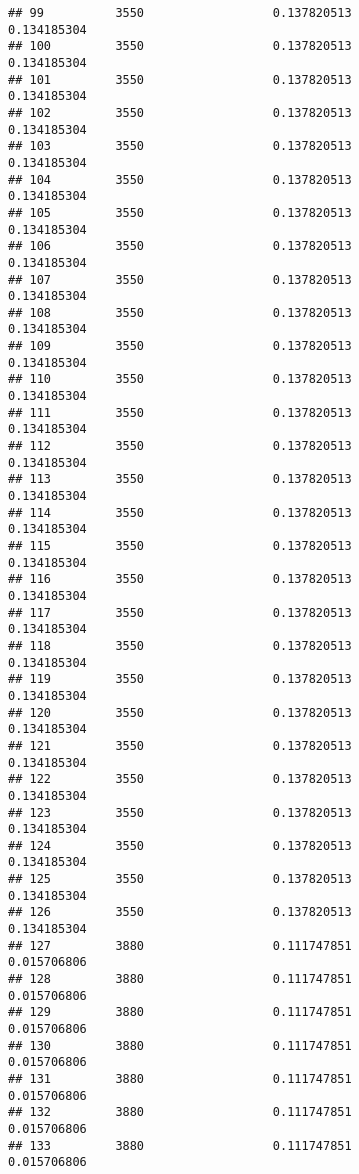 \documentclass[]{article}
\begin{document}
\begin{verbatim}
## 99          3550                  0.137820513                0.134185304
## 100         3550                  0.137820513                0.134185304
## 101         3550                  0.137820513                0.134185304
## 102         3550                  0.137820513                0.134185304
## 103         3550                  0.137820513                0.134185304
## 104         3550                  0.137820513                0.134185304
## 105         3550                  0.137820513                0.134185304
## 106         3550                  0.137820513                0.134185304
## 107         3550                  0.137820513                0.134185304
## 108         3550                  0.137820513                0.134185304
## 109         3550                  0.137820513                0.134185304
## 110         3550                  0.137820513                0.134185304
## 111         3550                  0.137820513                0.134185304
## 112         3550                  0.137820513                0.134185304
## 113         3550                  0.137820513                0.134185304
## 114         3550                  0.137820513                0.134185304
## 115         3550                  0.137820513                0.134185304
## 116         3550                  0.137820513                0.134185304
## 117         3550                  0.137820513                0.134185304
## 118         3550                  0.137820513                0.134185304
## 119         3550                  0.137820513                0.134185304
## 120         3550                  0.137820513                0.134185304
## 121         3550                  0.137820513                0.134185304
## 122         3550                  0.137820513                0.134185304
## 123         3550                  0.137820513                0.134185304
## 124         3550                  0.137820513                0.134185304
## 125         3550                  0.137820513                0.134185304
## 126         3550                  0.137820513                0.134185304
## 127         3880                  0.111747851                0.015706806
## 128         3880                  0.111747851                0.015706806
## 129         3880                  0.111747851                0.015706806
## 130         3880                  0.111747851                0.015706806
## 131         3880                  0.111747851                0.015706806
## 132         3880                  0.111747851                0.015706806
## 133         3880                  0.111747851                0.015706806

\end{verbatim}
\end{document}
